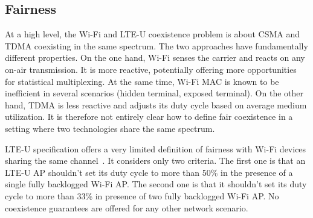 




\subsection{Fairness}
\label{sec:fairness}

At a high level, the Wi-Fi and LTE-U coexistence problem is about CSMA and TDMA coexisting in the same spectrum. The two approaches have fundamentally different properties. On the one hand, Wi-Fi senses the carrier and reacts on any on-air transmission. It is more reactive, potentially offering more opportunities for statistical multiplexing. At the same time, Wi-Fi MAC is known to be inefficient in several scenarios (hidden terminal, exposed terminal). On the other hand, TDMA is less reactive and adjusts its duty cycle based on average medium utilization. It is therefore not entirely clear how to define fair coexistence in a setting where two technologies share the same spectrum. 

LTE-U specification offers a very limited definition of fairness with Wi-Fi devices sharing the same channel~\cite{lteuforum_lteu}. It considers only two criteria. 
The first one is that an LTE-U AP shouldn't set its duty cycle to more than 50\% in the presence of a single fully backlogged Wi-Fi AP.
The second one is that it shouldn't set its duty cycle to more than 33\% in presence of two fully backlogged Wi-Fi AP.
No coexistence guarantees are offered for any other network scenario.

